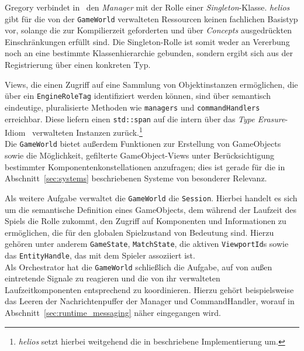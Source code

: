 \vspace{5mm}
\begin{tcolorbox}[title={Die Verwendung von Singletons in \textit{helios}}, colback=black!5, colframe=black]
    Gregory verbindet in~\cite[S. 418]{Gre19} den \textit{Manager} mit der Rolle einer \textit{Singleton}-Klasse.
    \textit{helios} gibt für die von der \texttt{GameWorld} verwalteten Ressourcen keinen fachlichen Basistyp vor, solange die zur Kompilierzeit geforderten und über \textit{Concepts} ausgedrückten Einschränkungen erfüllt sind.
    Die Singleton-Rolle ist somit weder an Vererbung noch an eine bestimmte Klassenhierarchie gebunden, sondern ergibt sich aus der Registrierung über einen konkreten Typ.
\end{tcolorbox}
\vspace{5mm}

Views, die einen Zugriff auf eine Sammlung von Objektinstanzen ermöglichen, die über ein \texttt{EngineRoleTag} identifiziert werden können, sind über semantisch eindeutige, pluralisierte Methoden wie \texttt{managers} und \texttt{commandHandlers} erreichbar.
Diese liefern einen \texttt{std::span} auf die intern über das \textit{Type Erasure}-Idiom~\cite[S. 318-328]{Ban22} verwalteten Instanzen zurück.\footnote{
    \textit{helios} setzt hierbei weitgehend die in \cite{TypeErasure} beschriebene Implementierung um.
}\\

Die \texttt{GameWorld} bietet außerdem Funktionen zur Erstellung von GameObjects sowie die Möglichkeit, gefilterte GameObject-Views unter Berücksichtigung bestimmter Komponentenkonstellationen anzufragen; dies ist gerade für die in Abschnitt~\ref{sec:systems} beschriebenen Systeme von besonderer Relevanz.

Als weitere Aufgabe verwaltet die \texttt{GameWorld} die \texttt{Session}.
Hierbei handelt es sich um die semantische Definition eines GameObjects, dem während der Laufzeit des Spiels die Rolle zukommt, den Zugriff auf Komponenten und Informationen zu ermöglichen, die für den globalen Spielzustand von Bedeutung sind.
Hierzu gehören unter anderem \texttt{GameState}, \texttt{MatchState}, die aktiven \texttt{ViewportId}s sowie das \texttt{EntityHandle}, das mit dem Spieler assoziiert ist.\\

Als Orchestrator hat die \texttt{GameWorld} schließlich die Aufgabe, auf von außen eintretende Signale zu reagieren und die von ihr verwalteten Laufzeitkomponenten entsprechend zu koordinieren.
Hierzu gehört beispielsweise das Leeren der Nachrichtenpuffer der Manager und CommandHandler, worauf in Abschnitt~\ref{sec:runtime_messaging} näher eingegangen wird.
